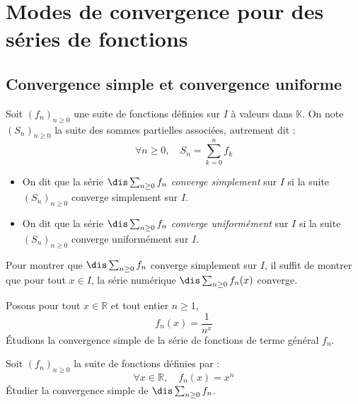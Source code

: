 \documentclass[a4paper,10pt]{report}
\begin{document}
\section{Modes de convergence pour des séries de fonctions}
\subsection{Convergence simple et convergence uniforme}
\begin{defin} Soit $(f_n)_{n \geq 0}$ une suite de fonctions définies sur $I$ à valeurs dans $\mathbb{K}$. On note $(S_n)_{n \geq 0}$ la suite des sommes partielles associées, autrement dit :
$$ \forall n \geq 0, \quad S_n = \sum_{k=0}^n f_k $$

\begin{itemize}
\item On dit que la série $\dis \sum_{n \geq 0} f_n$ \textit{converge simplement} sur $I$ si la suite $(S_n)_{n \geq 0}$ converge simplement sur $I$.
\item On dit que la série $\dis \sum_{n \geq 0} f_n$ \textit{converge uniformément} sur $I$ si la suite $(S_n)_{n \geq 0}$ converge uniformément sur $I$.
\end{itemize}
\end{defin}

\begin{metho} Pour montrer que $\dis \sum_{n \geq 0} f_n$ converge simplement sur $I$, il suffit de montrer que pour tout $x \in I$, la série numérique $\dis \sum_{n \geq 0} f_n(x)$ converge.
\end{metho}

\begin{ex} Posons pour tout $x \in \mathbb{R}$ et tout entier $n \geq 1$,
$$ f_n(x) = \frac{1}{n^x}$$
Étudions la convergence simple de la série de fonctions de terme général $f_n$.

\vspace{5cm}
%
\end{ex}

\begin{exa} Soit $(f_n)_{n \geq 0}$ la suite de fonctions définies par :
$$ \forall x \in \mathbb{R}, \quad f_n(x) = x^n$$
Étudier la convergence simple de $\dis \sum_{n \geq 0} f_n$.
\end{exa}
\end{document}
